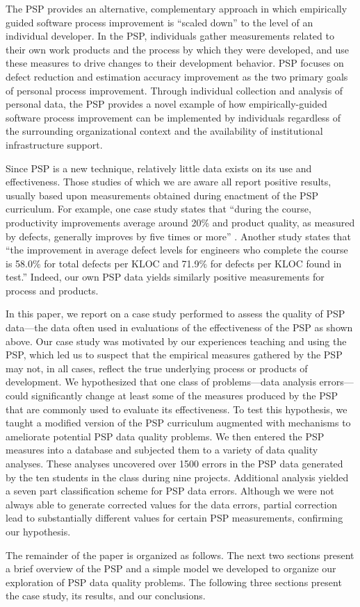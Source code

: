 The PSP provides an alternative, complementary approach in which
empirically guided software process improvement is ``scaled down'' to the
level of an individual developer.  In the PSP, individuals gather
measurements related to their own work products and the process by which
they were developed, and use these measures to drive changes to their
development behavior.  PSP focuses on defect reduction and
estimation accuracy improvement as the two primary goals of personal
process improvement. Through individual collection and analysis of personal
data, the PSP provides a novel example of how empirically-guided software
process improvement can be implemented by individuals regardless of the
surrounding organizational context and the availability of institutional
infrastructure support.

Since PSP is a new technique, relatively little data exists on its use and
effectiveness.  Those studies of which we are aware all report positive
results, usually based upon measurements obtained during enactment of the PSP
curriculum. For example, one case study states that ``during the
course, productivity improvements average around 20\% and product quality,
as measured by defects, generally improves by five times or more''
\cite{Ferguson97}. Another study states that ``the improvement in average
defect levels for engineers who complete the course is 58.0\% for total
defects per KLOC and 71.9\% for defects per KLOC found in test.''  Indeed,
our own PSP data yields similarly positive measurements for process and
products.

In this paper, we report on a case study performed to assess the quality
of PSP data---the data often used in evaluations of the effectiveness of
the PSP as shown above.  Our case study was motivated by
our experiences teaching and using the PSP, which led us to suspect
that the empirical measures gathered by the PSP may not, in all cases,
reflect the true underlying process or products of development.  
We hypothesized that one class of problems---data analysis errors---could
significantly change at least some of the measures produced by the PSP that
are commonly used to evaluate its effectiveness.  To test this hypothesis,
we taught a modified version of the PSP curriculum augmented with
mechanisms to ameliorate potential PSP data quality problems.  We then
entered the PSP measures into a database and subjected them to a variety of
data quality analyses.  These analyses uncovered over 1500 errors in the
PSP data generated by the ten students in the class during nine projects.
Additional analysis yielded a seven part classification scheme for PSP data
errors.  Although we were not always able to generate corrected values for
the data errors, partial correction lead to substantially different values
for certain PSP measurements, confirming our hypothesis.

The remainder of the paper is organized as follows. The next two sections
present a brief overview of the PSP and a simple model we developed to
organize our exploration of PSP data quality problems. The following three
sections present the case study, its results, and our conclusions.

